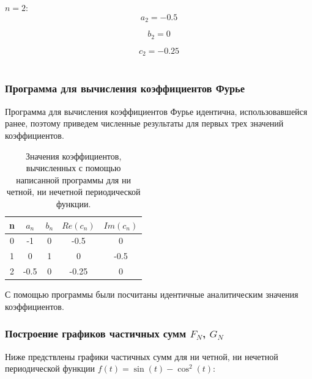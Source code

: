 \documentclass[a5paper, 10pt]{article}
\theoremstyle{definition}
\theoremstyle{plain}
\theoremstyle{remark}
\begin{document}
$n = 2:$
\begin{equation}
a_2  = -0.5
\end{equation}

\begin{equation}
b_2 = 0
\end{equation}

\begin{equation}
c_2  = -0.25
\end{equation}
\\

\subsubsection{Программа для вычисления коэффициентов Фурье}

Программа для вычисления коэффициентов Фурье идентична, использовавшейся ранее, поэтому приведем численные результаты для первых трех значений коэффициентов.

\begin{table}[h]
\caption{Значения коэффициентов, вычисленных с помощью написанной программы для ни четной, ни нечетной периодической функции.}
\label{tabular:timesandtenses}
\begin{center}
\begin{tabular}{|c|c|c|c|c|}
\hline
n & $a_n$ & $b_n$ & $Re(c_n)$ & $Im(c_n)$ \\
\hline
0 & -1 & 0 & -0.5 & 0\\
\hline
1 & 0 & 1 & 0 & -0.5\\
\hline
2 & -0.5 & 0 & -0.25  & 0\\
\hline
\end{tabular}
\end{center}
\end{table}

С помощью программы были посчитаны идентичные аналитическим значения коэффициентов.

\subsubsection{Построение графиков частичных сумм $F_N$, $G_N$}

Ниже предствлены графики частичных сумм для ни четной, ни нечетной периодической функции $f(t) = \sin(t) - \cos^2(t)$:
\end{document}
